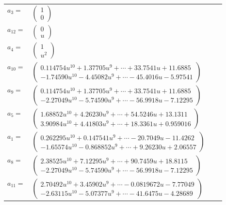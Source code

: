 \documentclass[1p]{elsarticle_modified}
\theoremstyle{definition}
\begin{document}
\begin{tabular}{m{7pt} m{180pt} m{7pt} m{180pt} }
\flushright $a_{3}=$&$\begin{pmatrix}1\\0\end{pmatrix}$ \\
\flushright $a_{12}=$&$\begin{pmatrix}0\\u\end{pmatrix}$ \\
\flushright $a_{4}=$&$\begin{pmatrix}1\\u^2\end{pmatrix}$ \\
\flushright $a_{10}=$&$\begin{pmatrix}0.114754 u^{10}+1.37705 u^{9}+\cdots+33.7541 u+11.6885\\-1.74590 u^{10}-4.45082 u^{9}+\cdots-45.4016 u-5.97541\end{pmatrix}$ \\
\flushright $a_{9}=$&$\begin{pmatrix}0.114754 u^{10}+1.37705 u^{9}+\cdots+33.7541 u+11.6885\\-2.27049 u^{10}-5.74590 u^{9}+\cdots-56.9918 u-7.12295\end{pmatrix}$ \\
\flushright $a_{5}=$&$\begin{pmatrix}1.68852 u^{10}+4.26230 u^{9}+\cdots+54.5246 u+13.1311\\3.90984 u^{10}+4.41803 u^{9}+\cdots+18.3361 u+0.959016\end{pmatrix}$ \\
\flushright $a_{1}=$&$\begin{pmatrix}0.262295 u^{10}+0.147541 u^{9}+\cdots-20.7049 u-11.4262\\-1.65574 u^{10}-0.868852 u^{9}+\cdots+9.26230 u+2.06557\end{pmatrix}$ \\
\flushright $a_{8}=$&$\begin{pmatrix}2.38525 u^{10}+7.12295 u^{9}+\cdots+90.7459 u+18.8115\\-2.27049 u^{10}-5.74590 u^{9}+\cdots-56.9918 u-7.12295\end{pmatrix}$ \\
\flushright $a_{11}=$&$\begin{pmatrix}2.70492 u^{10}+3.45902 u^{9}+\cdots-0.0819672 u-7.77049\\-2.63115 u^{10}-5.07377 u^{9}+\cdots-41.6475 u-4.28689\end{pmatrix}$ \\

\end{tabular}
\end{document}
